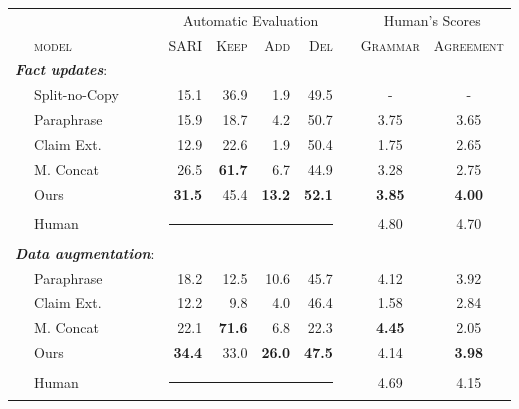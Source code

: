 \documentclass[letterpaper]{article} %
\begin{document}
\begin{table}[t]
\small
\centering
\begin{tabular}{llrrrrccc}
\toprule
& & \multicolumn{4}{c}{Automatic Evaluation} & & \multicolumn{2}{c}{Human's Scores}\\
\cmidrule(lr){3-6}\cmidrule(lr){8-9}
&\textsc{model}              & \textsc{SARI} & \textsc{Keep} & \textsc{Add} & \textsc{Del} & & \textsc{Grammar} & \textsc{Agreement} \\ 
\midrule
\multicolumn{2}{l}{\textit{\textbf{Fact updates}}:} &\\
&Split-no-Copy & 15.1 & 36.9 & 1.9 & 49.5 && - & -\\
&Paraphrase & 15.9 & 18.7 & 4.2 & 50.7 & & 3.75 & 3.65 \\
&Claim Ext.    & 12.9 & 22.6       & 1.9      & 50.4 & & 1.75 & 2.65     \\ 
&M. Concat     & 26.5 & \textbf{61.7}      & 6.7      & 44.9  & & 3.28 & 2.75 \\ 
&Ours & \textbf{31.5} & 45.4      & \textbf{13.2}      & \textbf{52.1}  & & \textbf{3.85} & \textbf{4.00} \\ 
&Human &\multicolumn{4}{r}{\rule[0.09cm]{4cm}{0.01cm}} & & 4.80 & 4.70 \\
\midrule

\multicolumn{2}{l}{\textit{\textbf{Data augmentation}}:} &\\
&Paraphrase & 18.2 & 12.5 & 10.6 & 45.7 & & 4.12 & 3.92 \\
&Claim Ext.    & 12.2 & 9.8       & 4.0      & 46.4  & & 1.58 & 2.84    \\ 
&M. Concat     & 22.1 & \textbf{71.6}      & 6.8      & 22.3  & & \textbf{4.45} & 2.05  \\ 
&Ours               & \textbf{34.4} & 33.0      & \textbf{26.0}     & \textbf{47.5}   & & 4.14 & \textbf{3.98}  \\
&Human &\multicolumn{4}{r}{\rule[0.09cm]{4cm}{0.01cm}} & & 4.69 & 4.15 \\



\end{tabular}
\end{table}
\end{document}
